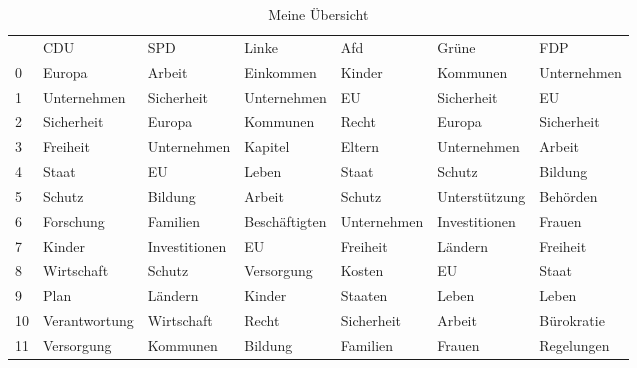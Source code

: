 \begin{table}
\caption{Meine Übersicht}
\thbold
\label{tab:meine_tabelle}
\begin{tabular}{lllllll}
 & CDU & SPD & Linke & Afd & Grüne & FDP \\
0 & Europa & Arbeit & Einkommen & Kinder & Kommunen & Unternehmen \\
1 & Unternehmen & Sicherheit & Unternehmen & EU & Sicherheit & EU \\
2 & Sicherheit & Europa & Kommunen & Recht & Europa & Sicherheit \\
3 & Freiheit & Unternehmen & Kapitel & Eltern & Unternehmen & Arbeit \\
4 & Staat & EU & Leben & Staat & Schutz & Bildung \\
5 & Schutz & Bildung & Arbeit & Schutz & Unterstützung & Behörden \\
6 & Forschung & Familien & Beschäftigten & Unternehmen & Investitionen & Frauen \\
7 & Kinder & Investitionen & EU & Freiheit & Ländern & Freiheit \\
8 & Wirtschaft & Schutz & Versorgung & Kosten & EU & Staat \\
9 & Plan & Ländern & Kinder & Staaten & Leben & Leben \\
10 & Verantwortung & Wirtschaft & Recht & Sicherheit & Arbeit & Bürokratie \\
11 & Versorgung & Kommunen & Bildung & Familien & Frauen & Regelungen \\
\end{tabular}
\end{table}
